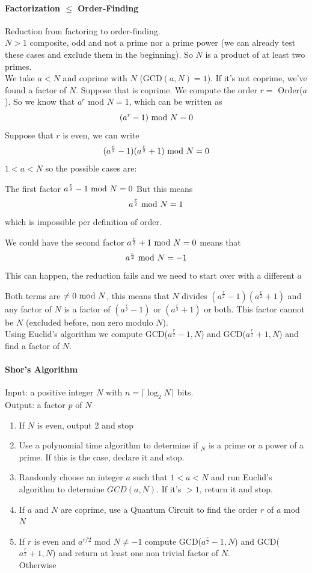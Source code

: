 \documentclass[10pt]{report}
\begin{document}
\paragraph{Factorization $\leq$ Order-Finding} Reduction from factoring to order-finding.\\
$N>1$ composite, odd and not a prime nor a prime power (we can already test these cases and exclude them in the beginning). So $N$ is a product of at least two primes.\\
We take $a< N$ and coprime with $N$ (GCD$(a,N)=1$). If it's not coprime, we've found a factor of $N$. Suppose that is coprime. We compute the order $r=$ Order($a$). So we know that $a^r$ mod $N=1$, which can be written as $$(a^r-1)\hbox{ mod }N = 0$$
Suppose that $r$ is even, we can write
$$(a^{\frac{r}{2}}-1)(a^{\frac{r}{2}}+1)\hbox{ mod }N = 0$$
$1<a<N$ so the possible cases are:\begin{list}{}{}
	\item The first factor $a^{\frac{r}{2}}-1\hbox{ mod }N = 0$
	But this means $$a^{\frac{r}{2}}\hbox{ mod }N = 1$$ which is impossible per definition of order.
	\item We could have the second factor $a^{\frac{r}{2}}+1\hbox{ mod }N = 0$ means that 
	$$a^{\frac{r}{2}}\hbox{ mod }N = -1$$
	This can happen, the reduction fails and we need to start over with a different $a$
	\item Both terms are $\neq0\hbox{ mod }N$, this means that $N$ divides $(a^{\frac{r}{2}}-1)(a^{\frac{r}{2}}+1)$ and any factor of $N$ is a factor of $(a^{\frac{r}{2}}-1)$ or $(a^{\frac{r}{2}}+1)$ or both. This factor cannot be $N$ (excluded before, non zero modulo $N$).\\
	Using Euclid's algorithm we compute GCD($a^{\frac{r}{2}}-1,N$) and GCD($a^{\frac{r}{2}}+1,N$) and find a factor of $N$.
\end{list}
\paragraph{Shor's Algorithm} 
Input: a positive integer $N$ with $n=\lceil\log_2 N\rceil$ bits.\\
Output: a factor $p$ of $N$
\begin{enumerate}
	\item If $N$ is even, output 2 and stop
	\item Use a polynomial time algorithm to determine if $_N$ is a prime or a power of a prime. If this is the case, declare it and stop.
	\item Randomly choose an integer $a$ such that $1<a<N$ and run Euclid's algorithm to determine $GCD(a,N)$. If it's $>1$, return it and stop.
	\item If $a$ and $N$ are coprime, use a Quantum Circuit to find the order $r$ of $a$ mod $N$
	\item If $r$ is even and $a^{r/2}$ mod $N\neq -1$ compute GCD($a^{\frac{r}{2}}-1,N$) and GCD($a^{\frac{r}{2}}+1,N$) and return at least one non trivial factor of $N$.\\
	Otherwise
\end{enumerate}
\end{document}
